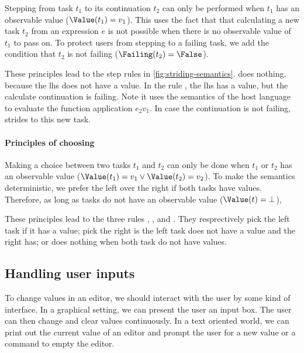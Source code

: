 Stepping from task $t_1$ to its continuation $t_2$ can only be performed when
$t_1$ has an observable value ($\Value(t_1) = v_1$).
This uses the fact that that calculating a new task $t_2$ from an expression $e$
is not possible when there is no observable value of $t_1$ to pass on.
To protect users from stepping to a failing task,
we add the condition that $t_2$ is not failing ($\Failing(t_2) = \False$).

These principles lead to the step rules in \autoref{fig:striding-semantics}.
 does nothing,
because the lhs does not have a value.
In the rule ,
the lhs has a value, but the calculate continuation is failing.
Note it uses the semantics of the host language to evaluate the function application $e_2 v_1$.
In case the continuation is not failing,
 strides to this new task.



\paragraph{Principles of choosing}
\label{sub:choosing-principles}

Making a choice between two tasks $t_1$ and $t_2$ can only be done when
$t_1$ or $t_2$ has an observable value ($\Value(t_1) = v_1 \lor \Value(t_2) = v_2$).
To make the semantics deterministic,
we prefer the left over the right if both tasks have values.
Therefore, as long as tasks do not have an observable value ($\Value(t) = \bot$),

These principles lead to the three rules , , and .
They resprectively pick the left task if it has a value;
pick the right is the left task does not have a value and the right has;
or does nothing when both task do not have values.



\subsection{Handling user inputs}
\label{sec:handling}

To change values in an editor,
we should interact with the user by some kind of interface.
In a graphical setting,
we can present the user an input box.
The user can then change and clear values continuously.
In a text oriented world,
we can print out the current value of an editor
and prompt the user for a new value
or a command to empty the editor.

